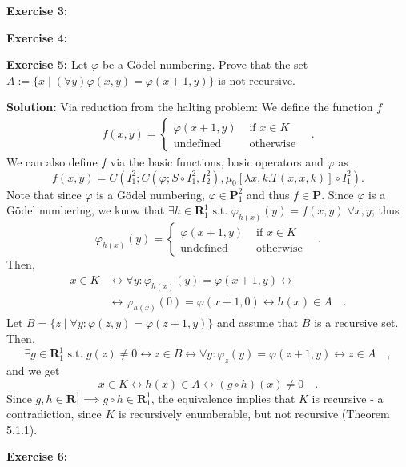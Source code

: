 \documentclass [11pt]{article}
\newcommand{\R}{\textbf{R}}
\renewcommand{\P}{\textbf{P}}
\newcommand{\lra}{\ensuremath{\leftrightarrow}}
\begin{document}
\bigskip
\noindent
\textbf{Exercise 3:}

\bigskip
\noindent
\textbf{Exercise 4:}

\bigskip
\noindent
\textbf{Exercise 5:} Let $\varphi$ be a G\"odel numbering. Prove that the set $A:= \{x \mid (\forall y)\varphi(x,y) = \varphi(x+1,y)\}$ is not recursive.

\noindent
\textbf{Solution:} 
Via reduction from the halting problem:
We define the function $f$
\begin{align*}
 f(x,y) = \begin{cases}
           \varphi(x+1,y) & \text{ if } x \in K \\
           \text{undefined} & \text{ otherwise} 
          \end{cases} \quad .
\end{align*} 
We can also define $f$ via the basic functions, basic operators and $\varphi$ as
$$
f(x,y) = C(I^2_1; C(\varphi; S \circ I^2_1, I^2_2), \mu_0 [\lambda x,k.T(x,x,k)]\circ I^2_1).
$$
Note that since $\varphi$ is a G\"odel numbering, $\varphi \in \P^2_1$ and thus $f \in \P$.
Since $\varphi$ is a G\"odel numbering, we know that $\exists h \in \R^1_1 \text{ s.t.\ } \varphi_{h(x)}(y) = f(x,y) \;\forall x,y$; thus
$$
\varphi_{h(x)}(y) = \begin{cases}
           \varphi(x+1,y) & \text{ if } x \in K \\
           \text{undefined} & \text{ otherwise}
          \end{cases} \quad.
$$
Then,
\begin{align*}
x \in K &\lra \forall y: \varphi_{h(x)}(y) = \varphi(x+1,y) \lra \\
&\lra \varphi_{h(x)}(0) = \varphi(x+1,0) \lra h(x) \in A \quad . 
\end{align*}
Let $B = \{z \mid \forall y: \varphi(z,y) =  \varphi(z+1,y)\}$ and assume that $B$ is a recursive set.
Then, 
$$
\exists g \in \R^1_1 \text{ s.t.\ } g(z) \neq 0 \lra z \in B \lra \forall y: \varphi_z(y) = \varphi(z+1,y) \lra z \in A \quad ,
$$
and we get 
$$
x \in K \lra h(x) \in A \lra (g \circ h)(x) \neq 0 \quad .
$$
Since $g,h \in \R^1_1 \implies g\circ h \in \R^1_1$, the equivalence implies that $K$ is recursive - a contradiction, since $K$ is recursively enumberable, but not recursive (Theorem 5.1.1).

\bigskip
\noindent
\textbf{Exercise 6:}
\end{document}
